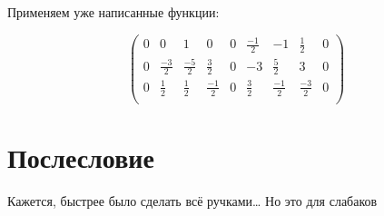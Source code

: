 \documentclass[12pt, a4paper]{article}
\newcommand\arr[2]{\left(\begin{array}{#1}#2\end{array}\right)}
\begin{document}
    Применяем уже написанные функции:

    \begin{equation}
        \arr{ccc|ccc|ccc}{
            0 & 0 & 1 & 0 & 0 & \frac{-1}{2} & -1 & \frac{1}{2} & 0\\
            0 & \frac{-3}{2} & \frac{-5}{2} & \frac{3}{2} & 0 & -3 & \frac{5}{2} & 3 & 0\\
            0 & \frac{1}{2} & \frac{1}{2} & \frac{-1}{2} & 0 & \frac{3}{2} & \frac{-1}{2} & \frac{-3}{2} & 0\\
        }
    \end{equation}


    \section{Послесловие}

    Кажется, быстрее было сделать всё ручками… Но это для слабаков
\end{document}
